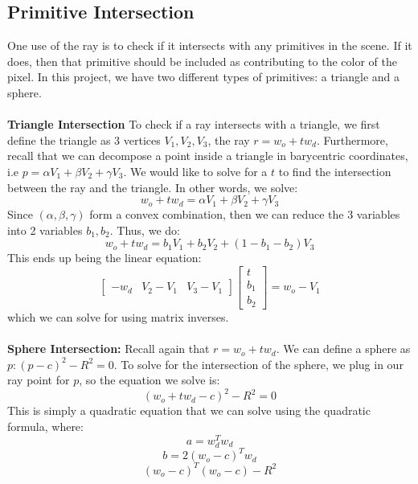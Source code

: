 \documentclass{article}
\begin{document}
\subsection{Primitive Intersection}
One use of the ray is to check if it intersects with any primitives in the scene. If it does, then that primitive should be included as contributing to the color of the pixel. In this project, we have two different types of primitives: a triangle and a sphere.
\\
\\
\textbf{Triangle Intersection}
To check if a ray intersects with a triangle, we first define the triangle as 3 vertices $V_1, V_2, V_3$, the ray $r = w_o + tw_d$. Furthermore, recall that we can decompose a point inside a triangle in barycentric coordinates, i.e $p = \alpha V_1 + \beta V_2 + \gamma V_3$. We would like to solve for a $t$ to find the intersection between the ray and the triangle. In other words, we solve:
$$w_o + tw_d = \alpha V_1 + \beta V_2 + \gamma V_3$$
Since $(\alpha, \beta, \gamma)$ form a convex combination, then we can reduce the 3 variables into 2 variables $b_1, b_2$. Thus, we do:
$$w_o + tw_d = b_1 V_1 + b_2 V_2 + (1 - b_1 - b_2) V_3$$
This ends up being the linear equation:
$$
\begin{bmatrix}
-w_d & V_2 - V_1  & V_3 - V_1 
\end{bmatrix}
\begin{bmatrix}
t \\
b_1 \\
b_2
\end{bmatrix}
= w_o - V_1
$$
which we can solve for using matrix inverses.
\\
\\
\textbf{Sphere Intersection: }Recall again that $r = w_o + tw_d$. We can define a sphere as $p : (p - c)^2 - R^2 = 0$. To solve for the intersection of the sphere, we plug in our ray point for $p$, so the equation we solve is:
$$(w_o + tw_d - c)^2 - R^2 = 0$$
This is simply a quadratic equation that we can solve using the quadratic formula, where:
$$a = w_d^Tw_d$$
$$b = 2(w_o - c)^Tw_d$$
$$(w_o - c)^T(w_o - c) - R^2$$
\end{document}
